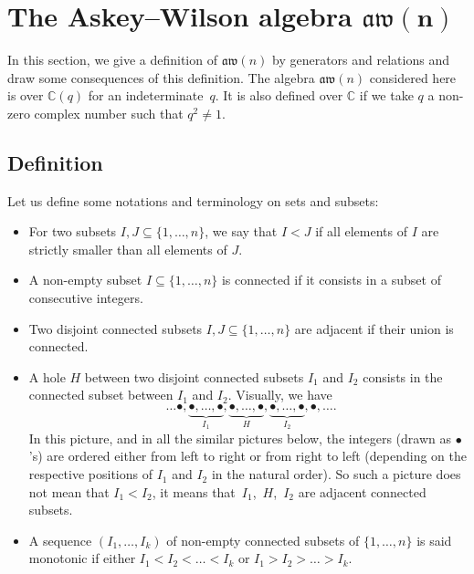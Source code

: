 \documentclass[pdftex]{sigma}
\numberwithin{equation}{section}
\theoremstyle{definition}
\newcommand{\aw}{\mathfrak{aw}(n)}
\begin{document}


\section[The Askey--Wilson algebra aw(n)]{The Askey--Wilson algebra $\boldsymbol{\aw}$}\label{sec-def}

In this section, we give a definition of $\aw$ by generators and relations and draw some consequences of this definition.
The algebra $\aw$ considered here is over $\mathbb{C}(q)$ for an indeterminate~$q$. It is also defined over $\mathbb{C}$ if
we take $q$ a non-zero complex number such that $q^2\neq 1$.



\subsection{Definition}

Let us define some notations and terminology on sets and subsets:
\begin{itemize}\itemsep=0pt
 \item For two subsets $I,J\subseteq\{1,\dots,n\}$, we say that $I<J$ if all elements of $I$ are strictly smaller than all elements of $J$.

\item A non-empty subset $I\subseteq\{1,\dots,n\}$ is connected if it consists in a subset of consecutive integers.

\item Two disjoint connected subsets $I,J\subseteq\{1,\dots,n\}$ are adjacent if their union is connected.

\item A hole $H$ between two disjoint connected subsets $I_1$ and $I_2$ consists in the connected subset between $I_1$ and $I_2$. Visually, we have
\[\ \ \ldots \bullet,\underbrace{\bullet,\dots,\bullet}_{I_1},\underbrace{\bullet,\dots,\bullet}_{H},\underbrace{\bullet,\dots,\bullet}_{I_2},\bullet,\ldots .\]
In this picture, and in all the similar pictures below, the integers (drawn as $\bullet$'s) are ordered either from left to right or from right to left (depending on the respective positions of $I_1$ and $I_2$ in the natural order). So such a picture does not mean that $I_1<I_2$, it means that~$I_1$,~$H$,~$I_2$ are adjacent connected subsets.

\item
A sequence $(I_1,\dots,I_k)$ of non-empty connected subsets of $\{1,\dots,n\}$ is said monotonic if
either $I_1<I_2<\dots<I_k$ or $I_1>I_2>\dots>I_k$.
 \end{itemize}
\end{document}
